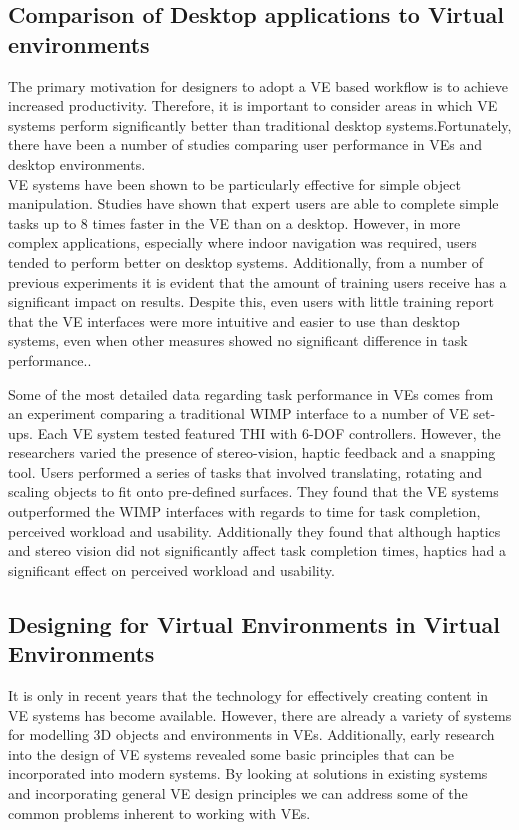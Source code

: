 \documentclass{sig-alternate-05-2015}
\begin{document}
\subsection{Comparison of Desktop applications to Virtual environments}
The primary motivation for designers to adopt a VE based workflow is to achieve increased productivity. Therefore, it is important to consider areas in which VE systems perform significantly better than traditional desktop systems.Fortunately, there have been a number of studies comparing user performance in VEs and desktop environments.\\

VE systems have been shown to be particularly effective for simple object manipulation. Studies have shown that expert users are able to complete simple tasks up to 8 times faster in the VE than on a desktop\cite{Schultheis2012}. However, in more complex applications, especially where indoor navigation was required, users tended to perform better on desktop systems\cite{SousaSantos2009}. Additionally, from a number of previous experiments it is evident that the amount of training users receive has a significant impact on results. Despite this, even users with little training report that the VE interfaces were more intuitive and easier to use than desktop systems, even when other measures showed no significant difference in task performance.\cite{Toma2012}.

Some of the most detailed data regarding task performance in VEs comes from an experiment comparing a traditional WIMP interface to a number of VE set-ups. Each VE system tested featured THI with 6-DOF controllers. However, the researchers varied the presence of stereo-vision, haptic feedback and a snapping tool\cite{Scali2003}. Users performed a series of tasks that involved translating, rotating and scaling objects to fit onto pre-defined surfaces. They found that the VE systems outperformed the WIMP interfaces with regards to time for task completion, perceived workload and usability. Additionally they found that although haptics and stereo vision did not significantly affect task completion times, haptics had a significant effect on perceived workload and usability.


\subsection{Designing for Virtual Environments in Virtual Environments}
It is only in recent years that the technology for effectively creating content in VE systems has become available. However, there are already a variety of systems for modelling 3D objects and environments in VEs. Additionally, early research into the design of VE systems revealed some basic principles that can be incorporated into modern systems. By looking at solutions in existing systems and incorporating general VE design principles we can address some of the common problems inherent to working with VEs.\\
\end{document}
